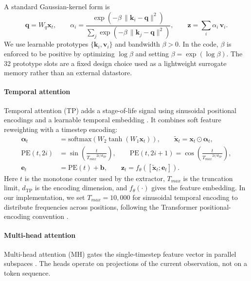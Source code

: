 \documentclass[sn-basic]{sn-jnl}%
\begin{document}
A standard Gaussian-kernel form is
\begin{equation}
        \mathbf{q}=W_q\mathbf{x}_t,\qquad
        \alpha_i = \frac{\exp\left(-\beta\,\lVert \mathbf{k}_i-\mathbf{q}\rVert^2\right)}{\sum_j \exp\left(-\beta\,\lVert \mathbf{k}_j-\mathbf{q}\rVert^2\right)},
        \qquad \mathbf{z}=\sum_i\alpha_i\,\mathbf{v}_i.
\end{equation}
We use learnable prototypes $\{\mathbf{k}_i,\mathbf{v}_i\}$ and bandwidth $\beta>0$. In the code, $\beta$ is enforced to be positive by optimizing $\log \beta$ and setting $\beta=\exp(\log \beta)$. The 32 prototype slots are a fixed design choice used as a lightweight surrogate memory rather than an external datastore.

\paragraph{Temporal attention}
Temporal attention (TP) adds a stage-of-life signal using sinusoidal positional encodings and a learnable temporal embedding \cite{Vaswani2017, Lim2020TFT}. It combines soft feature reweighting with a timestep encoding:
\begin{align}
        \boldsymbol{\alpha}_t &= \mathrm{softmax}\!\left(W_2\tanh\!\left(W_1\mathbf{x}_t\right)\right),
        \qquad \tilde{\mathbf{x}}_t = \mathbf{x}_t\odot\boldsymbol{\alpha}_t,\\
        \mathrm{PE}(t,2i) &= \sin\!\left(\frac{t}{{T_{max}}^{2i/d_{\mathrm{TP}}}}\right),
        \qquad \mathrm{PE}(t,2i+1)=\cos\!\left(\frac{t}{{T_{max}}^{2i/d_{\mathrm{TP}}}}\right),\\
        \mathbf{e}_t &= \mathrm{PE}(t) + \mathbf{b},
        \qquad \mathbf{z}_t = f_\theta\!\left([\tilde{\mathbf{x}}_t;\mathbf{e}_t]\right).
\end{align}
Here $t$ is the monotone counter used by the extractor, $T_{max}$ is the truncation limit, $d_{\mathrm{TP}}$ is the encoding dimension, and $f_\theta(\cdot)$ gives the feature embedding. In our implementation, we set $T_{max}=10{,}000$ for sinusoidal temporal encoding to distribute frequencies across positions, following the Transformer positional-encoding convention \cite{Vaswani2017}.

\paragraph{Multi-head attention}
Multi-head attention (MH) gates the single-timestep feature vector in parallel subspaces \cite{Vaswani2017}. The heads operate on projections of the current observation, not on a token sequence.
\end{document}
